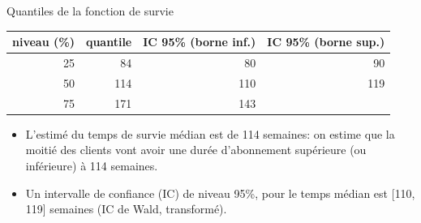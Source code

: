 \documentclass[
  ignorenonframetext,
]{beamer}
\providecommand{\tightlist}{%
  \setlength{\itemsep}{0pt}\setlength{\parskip}{0pt}}\usepackage{longtable,booktabs,array}
\begin{document}
\begin{frame}{Quantiles de la fonction de survie}
\protect\hypertarget{quantiles-de-la-fonction-de-survie}{}
\begin{table}
\centering
\begin{tabular}{rrrr}
\toprule
niveau (\%) & quantile & IC 95\% (borne inf.) & IC 95\% (borne sup.)\\
\midrule
25 & 84 & 80 & 90\\
50 & 114 & 110 & 119\\
75 & 171 & 143 & \\
\bottomrule
\end{tabular}
\end{table}

\begin{itemize}
\tightlist
\item
  L'estimé du temps de survie médian est de 114 semaines: on estime que
  la moitié des clients vont avoir une durée d'abonnement supérieure (ou
  inférieure) à 114 semaines.
\item
  Un intervalle de confiance (IC) de niveau 95\%, pour le temps médian
  est {[}110, 119{]} semaines (IC de Wald, transformé).
\end{itemize}
\end{frame}
\end{document}
